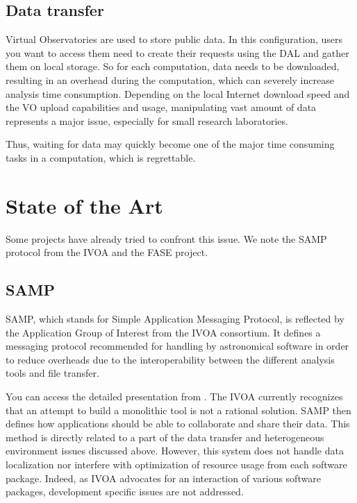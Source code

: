 		\subsection{Data transfer}
			Virtual Observatories are used to store public data. In this configuration, users you want to access them need to create their requests using the DAL and gather them on local storage. So for each computation, data needs to be downloaded, resulting in an overhead during the computation, which can severely increase analysis time consumption. Depending on the local Internet download speed and the VO upload capabilities and usage, manipulating vast amount of data represents a major issue, especially for small research laboratories.
			
			Thus, waiting for data may quickly become one of the major time consuming tasks in a computation, which is regrettable.

	\section{State of the Art}
		Some projects have already tried to confront this issue. We note the SAMP protocol from the IVOA and the FASE project.
		
		\subsection{SAMP}
			SAMP, which stands for Simple Application Messaging Protocol, is reflected by the Application Group of Interest from the IVOA consortium. It defines a messaging protocol recommended for handling by astronomical software in order to reduce overheads due to the interoperability between the different analysis tools and file transfer.
			
			You can access the detailed presentation from \cite{Taylor}. The IVOA currently recognizes that an attempt to build a monolithic tool is not a rational solution. SAMP then defines how applications should be able to collaborate and share their data. This method is directly related to a part of the data transfer and heterogeneous environment issues discussed above. However, this system does not handle data localization nor interfere with optimization of resource usage from each software package. Indeed, as IVOA advocates for an interaction of various software packages, development specific issues are not addressed. 
			
